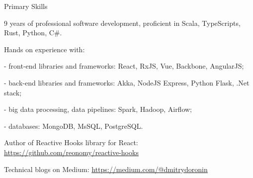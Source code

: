 \documentclass{resume}
\begin{document}

\begin{rSection}{Primary Skills}

9 years of professional software development, proficient in Scala, TypeScripts, Rust, Python, C\#.

\item Hands on experience with:
\item - front-end libraries and frameworks: 
React, RxJS, Vue, Backbone, AngularJS;
\item - back-end libraries and frameworks: 
Akka, NodeJS Express, Python Flask, .Net stack;
\item - big data processing, data pipelines:
Spark, Hadoop, Airflow;
\item - databases:
MongoDB, MsSQL, PostgreSQL.

\item Author of Reactive Hooks library for React: \url{https://github.com/reonomy/reactive-hooks}
\item Technical blogs on Medium: \url{https://medium.com/@dmitrydoronin}

\end{rSection}

\end{document}
